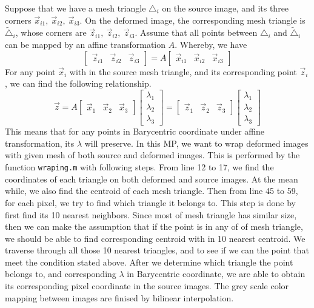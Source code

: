 \documentclass{article}
\begin{document}
	 Suppose that we have a mesh triangle $\triangle_i$ on the source image, and its three corners $\overrightarrow{x}_{i1},~ \overrightarrow{x}_{i2},~\overrightarrow{x}_{i3}$. On the deformed image, the corresponding mesh triangle is $\tilde{\triangle}_i$, whose corners are  $\overrightarrow{z}_{i1},~ \overrightarrow{z}_{i2},~\overrightarrow{z}_{i3}$. Assume that all points between ${\triangle}_i$ and $\tilde{\triangle}_i$ can be mapped by an affine transformation $A$. Whereby, we have
	\begin{equation}
	\begin{bmatrix}
	\overrightarrow{z}_{i1} &\overrightarrow{z}_{i2}&\overrightarrow{z}_{i3}
	\end{bmatrix}=A\begin{bmatrix}
	\overrightarrow{x}_{i1} &\overrightarrow{x}_{i2}&\overrightarrow{x}_{i3}
	\end{bmatrix}
	\end{equation}
	For any point $\overrightarrow{x}_{i}$ with in the source mesh triangle, and its corresponding point $\overrightarrow{z}_{i}$, we can find the following relationship.
	\begin{equation}
	\overrightarrow{z}=A\begin{bmatrix}
	\overrightarrow{x}_1 & \overrightarrow{x}_2 & \overrightarrow{x}_3
	\end{bmatrix}\begin{bmatrix}
	\lambda_1\\ \lambda_2\\ \lambda_3
	\end{bmatrix}=\begin{bmatrix}
	\overrightarrow{z}_1 & \overrightarrow{z}_2 & \overrightarrow{z}_3
	\end{bmatrix}\begin{bmatrix}
	\lambda_1\\ \lambda_2\\ \lambda_3
	\end{bmatrix}
	\end{equation}
	This means that for any points in Barycentric coordinate under affine transformation, its $\lambda$ will preserve. In this MP, we want to wrap deformed images with given mesh of both source and deformed images. This is performed by the function \texttt{wraping.m} with following steps. From line 12 to 17, we find the coordinates of each triangle on both deformed and source images. At the mean while, we also find the centroid of each mesh triangle. Then from line 45 to 59, for each pixel, we try to find which triangle it belongs to. This step is done by first find its 10 nearest neighbors. Since most of mesh triangle has similar size, then we can make the assumption that if the point is in any of of mesh triangle, we should be able to find corresponding centroid with in 10 nearest centroid. We traverse through all those 10 nearest triangles, and to see if we can the point that meet the condition stated above. After we determine which triangle the point belongs to, and corresponding $\lambda$ in Barycentric coordinate, we are able to obtain its corresponding pixel coordinate in the source images. The grey scale color mapping between images are finised by bilinear interpolation.
	
\end{document}
